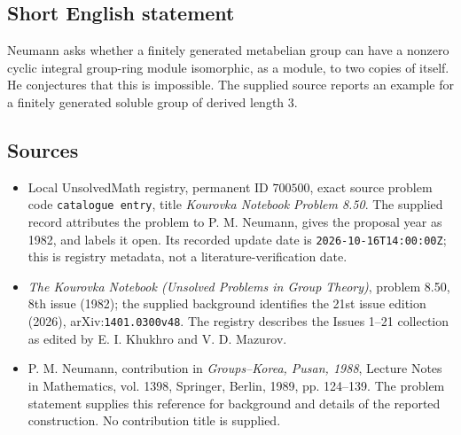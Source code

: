 \documentclass[11pt]{article}
\begin{document}
\subsection{Short English statement}
Neumann asks whether a finitely generated metabelian group can have a nonzero cyclic integral group-ring module isomorphic, as a module, to two copies of itself. He conjectures that this is impossible. The supplied source reports an example for a finitely generated soluble group of derived length \(3\).
\subsection{Sources}
\begin{itemize}
\item Local UnsolvedMath registry, permanent ID \(700500\), exact source problem code \texttt{catalogue entry}, title \emph{Kourovka Notebook Problem 8.50}. The supplied record attributes the problem to P. M. Neumann, gives the proposal year as 1982, and labels it open. Its recorded update date is \texttt{2026-10-16T14:00:00Z}; this is registry metadata, not a literature-verification date.
\item \emph{The Kourovka Notebook (Unsolved Problems in Group Theory)}, problem 8.50, 8th issue (1982); the supplied background identifies the 21st issue edition (2026), arXiv:\texttt{1401.0300v48}. The registry describes the Issues 1--21 collection as edited by E. I. Khukhro and V. D. Mazurov.
\item P. M. Neumann, contribution in \emph{Groups--Korea, Pusan, 1988}, Lecture Notes in Mathematics, vol. 1398, Springer, Berlin, 1989, pp. 124--139. The problem statement supplies this reference for background and details of the reported construction. No contribution title is supplied.
\end{itemize}
\end{document}
